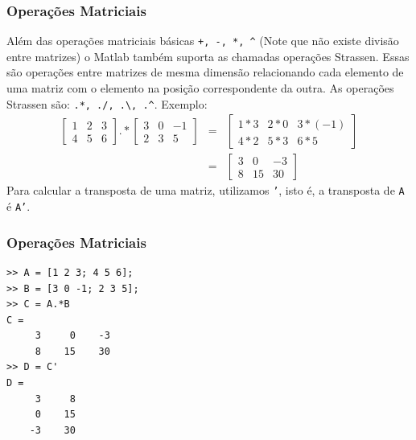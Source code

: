 \documentclass{beamer}
\begin{document}
\begin{frame}
\frametitle{Opera\c{c}\~oes Matriciais}

Al\'em das opera\c{c}\~oes matriciais b\'asicas {\tt +, -, *, \textasciicircum} (Note que n\~ao existe divis\~ao entre matrizes) o Matlab tamb\'em suporta as chamadas opera\c{c}\~oes Strassen. Essas s\~ao opera\c{c}\~oes entre matrizes de mesma dimens\~ao relacionando cada elemento de uma matriz com o elemento na posi\c{c}\~ao correspondente da outra. As opera\c{c}\~oes Strassen s\~ao: {\tt .*, ./, .\textbackslash, .\textasciicircum}.
\pause
Exemplo:
\begin{eqnarray*}
\left[
\begin{array}{ccc}
1 & 2 & 3 \\
4 & 5 & 6
\end{array}
\right].*
\left[
\begin{array}{ccc}
3 & 0 & -1 \\
2 & 3 & 5
\end{array}
\right] & = &
\left[
\begin{array}{ccc}
1*3 & 2*0 & 3*(-1) \\
4*2 & 5*3 & 6*5
\end{array}
\right] \\
& = &
\left[
\begin{array}{ccc}
3 & 0 & -3 \\
8 & 15 & 30
\end{array}
\right]
\end{eqnarray*}
\pause
Para calcular a transposta de uma matriz, utilizamos {\tt '}, isto \'e, a transposta de {\tt A} \'e {\tt A'}.
\end{frame}

\begin{frame}[fragile]
\frametitle{Opera\c{c}\~oes Matriciais}
\begin{verbatim}
>> A = [1 2 3; 4 5 6];
>> B = [3 0 -1; 2 3 5];
>> C = A.*B
C = 
     3     0    -3
     8    15    30
>> D = C'
D = 
     3     8
     0    15
    -3    30
\end{verbatim}
\end{frame}

\subsection[Cria\c{c}\~ao de Vetores]{}
\end{document}
